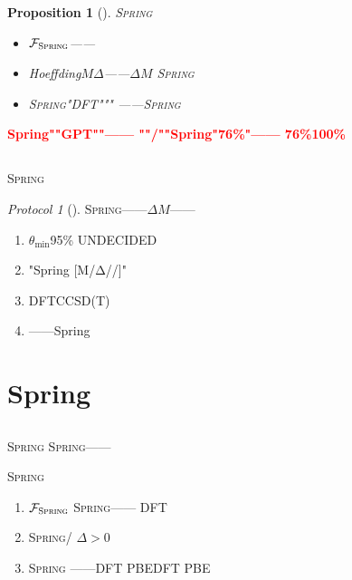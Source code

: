 \documentclass[12pt,a4paper]{article}
\newtheorem{proposition}[theorem]{Proposition}
\theoremstyle{remark}
\newtheorem{protocol}[theorem]{Protocol}
\newcommand{\Fset}{\mathcal{F}}
\newcommand{\Spring}{\textsc{Spring}}
\newcommand{\honestcrit}[1]{%
    \textcolor{red}{\textbf{#1}}%
}
\begin{document}
\begin{proposition}[]\label{prop:self_awareness_feasible}
\Spring{}
\begin{itemize}[itemsep=3pt]
    \item \textbf{} $\Fset_{\Spring}$——
    \item \textbf{} Hoeffding$M$$\Delta$——$\Delta$$M$
    \Spring{}
    \item \textbf{} \Spring{}"DFT"""
    ——\Spring{}
\end{itemize}
\end{proposition}

\honestcrit{Spring""GPT""——
""/""Spring"76\%"——
76\%100\%}

\subsection{}

\Spring{}

\begin{protocol}[]\label{protocol:boundary_operation}
\Spring{}——$\Delta$$M$——

\begin{enumerate}[label=(\arabic*), itemsep=3pt]
    \item \textbf{} $\theta_{\min}$95\%
    \textsc{UNDECIDED}
    \item \textbf{} "Spring
    [M/Δ//]"
    \item \textbf{} 
    DFTCCSD(T)
    \item \textbf{} ——Spring\textbf{}
    
\end{enumerate}
\end{protocol}

\newpage

\section{Spring}

\subsection{}

\Spring{}
\Spring{}——

\Spring{}
\begin{enumerate}[label=(\arabic*), itemsep=4pt]
    \item \textbf{$\Fset_{\Spring}$} \Spring{}——
    DFT
    \item \textbf{} \Spring{}/
    $\Delta > 0$
    \item \textbf{} \Spring{}
    \textbf{}——DFT PBEDFT PBE
\end{enumerate}
\end{document}

